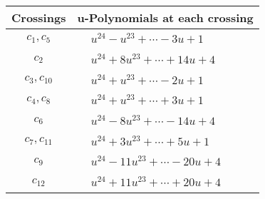 \documentclass[1p]{elsarticle_modified}
\theoremstyle{definition}
\begin{document}
\begin{tabular}{m{50pt}|m{274pt}}
Crossings & \hspace{64pt}u-Polynomials at each crossing \\
\hline $$\begin{aligned}c_{1},c_{5}\end{aligned}$$&$\begin{aligned}
&u^{24}- u^{23}+\cdots-3 u+1
\end{aligned}$\\
\hline $$\begin{aligned}c_{2}\end{aligned}$$&$\begin{aligned}
&u^{24}+8 u^{23}+\cdots+14 u+4
\end{aligned}$\\
\hline $$\begin{aligned}c_{3},c_{10}\end{aligned}$$&$\begin{aligned}
&u^{24}+u^{23}+\cdots-2 u+1
\end{aligned}$\\
\hline $$\begin{aligned}c_{4},c_{8}\end{aligned}$$&$\begin{aligned}
&u^{24}+u^{23}+\cdots+3 u+1
\end{aligned}$\\
\hline $$\begin{aligned}c_{6}\end{aligned}$$&$\begin{aligned}
&u^{24}-8 u^{23}+\cdots-14 u+4
\end{aligned}$\\
\hline $$\begin{aligned}c_{7},c_{11}\end{aligned}$$&$\begin{aligned}
&u^{24}+3 u^{23}+\cdots+5 u+1
\end{aligned}$\\
\hline $$\begin{aligned}c_{9}\end{aligned}$$&$\begin{aligned}
&u^{24}-11 u^{23}+\cdots-20 u+4
\end{aligned}$\\
\hline $$\begin{aligned}c_{12}\end{aligned}$$&$\begin{aligned}
&u^{24}+11 u^{23}+\cdots+20 u+4
\end{aligned}$\\
\hline
\end{tabular}\\~\\
\end{document}
